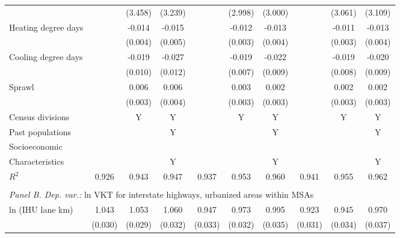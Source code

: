 \begin{table}[htbp]
\begin{tabular}{l*{9}{c}}
                    &                     &     (3.458)         &     (3.239)         &                     &     (2.998)         &     (3.000)         &                     &     (3.061)         &     (3.109)         \\
[1em]
Heating degree days &                     &      -0.014\sym{**} &      -0.015\sym{**} &                     &      -0.012\sym{***}&      -0.013\sym{***}&                     &      -0.011\sym{**} &      -0.013\sym{***}\\
                    &                     &     (0.004)         &     (0.005)         &                     &     (0.003)         &     (0.004)         &                     &     (0.003)         &     (0.004)         \\
[1em]
Cooling degree days &                     &      -0.019         &      -0.027\sym{*}  &                     &      -0.019\sym{**} &      -0.022\sym{*}  &                     &      -0.019\sym{*}  &      -0.020\sym{*}  \\
                    &                     &     (0.010)         &     (0.012)         &                     &     (0.007)         &     (0.009)         &                     &     (0.008)         &     (0.009)         \\
[1em]
Sprawl              &                     &       0.006         &       0.006         &                     &       0.003         &       0.002         &                     &       0.002         &       0.002         \\
                    &                     &     (0.003)         &     (0.004)         &                     &     (0.003)         &     (0.003)         &                     &     (0.003)         &     (0.003)         \\
           Census divisions & & Y & Y & & Y & Y &  & Y & Y \\            Past populations & & & Y & & & Y &  & & Y \\           Socioeconomic           \\Characteristics & & & Y & & & Y &  & & Y \\           
\(R^{2}\)           &       0.926         &       0.943         &       0.947         &       0.937         &       0.953         &       0.960         &       0.941         &       0.955         &       0.962         \\
 
          \hline         \\         
\multicolumn{9}{l}{ \emph{Panel B. Dep. var.:} ln VKT for interstate highways, urbanized areas within MSAs } \\ 
ln (IHU lane km)    &       1.043\sym{***}&       1.053\sym{***}&       1.060\sym{***}&       0.947\sym{***}&       0.973\sym{***}&       0.995\sym{***}&       0.923\sym{***}&       0.945\sym{***}&       0.970\sym{***}\\
                    &     (0.030)         &     (0.029)         &     (0.032)         &     (0.033)         &     (0.032)         &     (0.035)         &     (0.031)         &     (0.034)         &     (0.037)         \\
 

\end{tabular}
\end{table}
